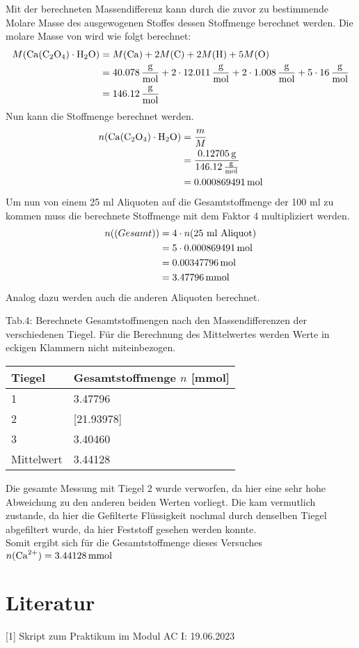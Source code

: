 \documentclass[12pt]{scrartcl} %
\begin{document}
Mit der berechneten Massendifferenz kann durch die zuvor zu bestimmende Molare Masse des ausgewogenen Stoffes dessen Stoffmenge berechnet werden.
Die molare Masse von  wird wie folgt berechnet:
\begin{align*}
  M(\ce{Ca(C2O4)\cdot H2O}) &= M(\ce{Ca}) + 2 M(\ce{C}) + 2 M(\ce{H}) + 5 M(\ce{O})\\
  &= 40.078\,\mathrm{\frac{g}{mol}} + 2\cdot  12.011\,\mathrm{\frac{g}{mol}} + 2\cdot 1.008\,\mathrm{\frac{g}{mol}} + 5\cdot 16\,\mathrm{\frac{g}{mol}}\\
  &= 146.12\,\mathrm{\frac{g}{mol}}
\end{align*}
Nun kann die Stoffmenge berechnet werden.
\begin{align*}
  n(\ce{Ca(C2O4)\cdot H2O}) &= \frac{m}{M}\\
  &= \frac{0.12705\,\mathrm{g}}{146.12\,\mathrm{\frac{g}{mol}}}\\
  &= 0.000869491\,\mathrm{mol}
\end{align*}
Um nun von einem 25 ml Aliquoten auf die Gesamtstoffmenge der 100 ml zu kommen muss die berechnete Stoffmenge mit dem Faktor 4 multipliziert werden.
\begin{align*}
  n(\text(Gesamt)) &= 4 \cdot n(\text{25 ml  Aliquot})\\
  &= 5 \cdot 0.000869491\,\mathrm{mol}\\
  &= 0.00347796\,\mathrm{mol}\\
  &= 3.47796\,\mathrm{mmol}
\end{align*}
Analog dazu werden auch die anderen Aliquoten berechnet.\\
\newpage
\begin{center}
  Tab.4: Berechnete Gesamtstoffmengen nach den Massendifferenzen der verschiedenen Tiegel. Für die Berechnung des Mittelwertes werden Werte in eckigen Klammern nicht miteinbezogen.\\
  \begin{tabular}{l l}
    \hline
    Tiegel & Gesamtstoffmenge $n$ [mmol]\\
    \hline
    1&3.47796\\
    2&[21.93978]\\
    3&3.40460\\
    \hline
    Mittelwert & 3.44128\\
    \hline
  \end{tabular}
\end{center}

Die gesamte Messung mit Tiegel 2 wurde verworfen, da hier eine sehr hohe Abweichung zu den anderen beiden Werten vorliegt. Die kam vermutlich zustande, da hier die Gefilterte Flüssigkeit nochmal durch denselben Tiegel abgefiltert wurde, da hier Feststoff gesehen werden konnte.\\
Somit ergibt sich für die Gesamtstoffmenge dieses Versuches $n(\ce{Ca^{2+}}) = 3.44128\,\mathrm{mmol}$

\section{Literatur}
[1] Skript zum Praktikum im Modul AC I: 19.06.2023
\end{document}

